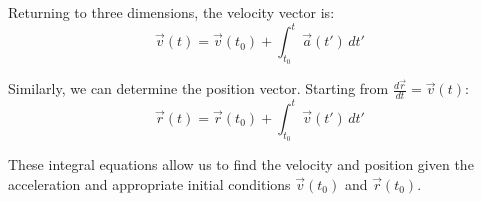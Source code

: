 \documentclass{article}
\begin{document}
\noindent
Returning to three dimensions, the velocity vector is:
\[
\vec{v}(t) = \vec{v}(t_0) + \int_{t_0}^{t} \vec{a}(t')\,dt'
\]

\noindent
Similarly, we can determine the position vector. Starting from $\frac{d\vec{r}}{dt} = \vec{v}(t)$:
\[
\vec{r}(t) = \vec{r}(t_0) + \int_{t_0}^{t} \vec{v}(t')\,dt'
\]

\noindent
These integral equations allow us to find the velocity and position given the acceleration and appropriate initial conditions $\vec{v}(t_0)$ and $\vec{r}(t_0)$.
\end{document}
